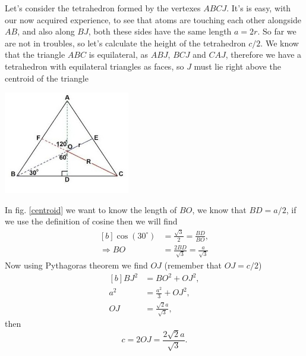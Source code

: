 \begin{questions}
\begin{solution}
  \label{hcp}\vspace{0.5cm}

Let's consider the tetrahedron formed by the vertexes $ABCJ$. It's is easy, with our now acquired experience, to see that atoms are touching each other alongside $AB$, and also along $BJ$, both these sides have the same length $a = 2r$. So far we are not in troubles, so let's calculate the height of the tetrahedron $c/2$. We know that the triangle $ABC$ is equilateral, as $ABJ$, $BCJ$ and $CAJ$, therefore we have a tetrahedron with equilateral triangles as faces, so $J$ must lie right above the centroid of the triangle

\begin{center}
  \includegraphics[width=55mm]{centroid}
\end{center}

\label{centroid}\vspace{0.5cm}

In fig. \ref{centroid} we want to know the length of $BO$, we know that $BD = a/2$, if we use the definition of cosine then we will find
\begin{equation}
  \begin{aligned}[b]
    \cos(30^\circ) &= \frac{\sqrt{3}}{2} = \frac{BD}{BO}, \\
    \Rightarrow BO &= \frac{2BD}{\sqrt{3}} = \frac{a}{\sqrt{3}}
  \end{aligned}
  \label{bo}
\end{equation}
Now using Pythagoras theorem we find $OJ$ (remember that $OJ = c/2$)
\begin{equation}
  \begin{aligned}[b]
    BJ^2 &= BO^2 + OJ^2,\\
    a^2 &= \frac{a^2}{3} + OJ^2,\\
    OJ &= \frac{\sqrt{2}a}{\sqrt{3}},
  \end{aligned}
\end{equation}
then
\begin{equation}
  c = 2OJ = \frac{2\sqrt{2}a}{\sqrt{3}}.
\end{equation}


\end{solution}
\end{questions}
